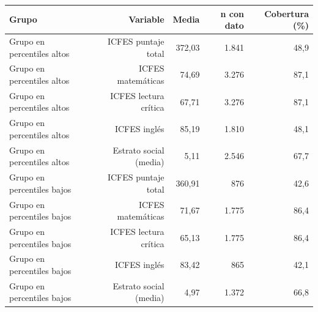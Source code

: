 \begin{tabular}{lrrrr}
\toprule
\textbf{Grupo} & \textbf{Variable} & \textbf{Media} & \textbf{n con dato} & \textbf{Cobertura (\%)} \\
\midrule
Grupo en percentiles altos & ICFES puntaje total & 372,03 & 1.841 & 48,9 \\
Grupo en percentiles altos & ICFES matemáticas & 74,69 & 3.276 & 87,1 \\
Grupo en percentiles altos & ICFES lectura crítica & 67,71 & 3.276 & 87,1 \\
Grupo en percentiles altos & ICFES inglés & 85,19 & 1.810 & 48,1 \\
Grupo en percentiles altos & Estrato social (media) & 5,11 & 2.546 & 67,7 \\
Grupo en percentiles bajos & ICFES puntaje total & 360,91 & 876 & 42,6 \\
Grupo en percentiles bajos & ICFES matemáticas & 71,67 & 1.775 & 86,4 \\
Grupo en percentiles bajos & ICFES lectura crítica & 65,13 & 1.775 & 86,4 \\
Grupo en percentiles bajos & ICFES inglés & 83,42 & 865 & 42,1 \\
Grupo en percentiles bajos & Estrato social (media) & 4,97 & 1.372 & 66,8 \\
\bottomrule
\end{tabular}
